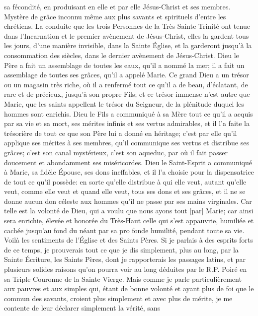 sa fécondité, en produisant en elle et par elle Jésus-Christ et ses membres. Mystère de grâce inconnu même aux
plus savants et spirituels d'entre les chrétiens.
 La conduite que les trois Personnes de la Très Sainte Trinité ont tenue dans l'Incarnation et le premier
avènement de Jésus-Christ, elles la gardent tous les jours, d'une manière invisible, dans la Sainte Église, et la
garderont jusqu'à la consommation des siècles, dans le dernier avènement de Jésus-Christ.
 Dieu le Père a fait un assemblage de toutes les eaux, qu'il a nommé la mer; il a fait un assemblage de toutes
ses grâces, qu'il a appelé Marie. Ce grand Dieu a un trésor ou un magasin très riche, où il a renfermé tout ce qu'il
a de beau, d'éclatant, de rare et de précieux, jusqu'à son propre Fils; et ce trésor immense n'est autre que Marie,
que les saints appellent le trésor du Seigneur, de la plénitude duquel les hommes sont enrichis.
 Dieu le Fils a communiqué à sa Mère tout ce qu'il a acquis par sa vie et sa mort, ses mérites infinis et ses
vertus admirables, et il l'a faite la trésorière de tout ce que son Père lui a donné en héritage; c'est par elle qu'il
applique ses mérites à ses membres, qu'il communique ses vertus et distribue ses grâces; c'est son canal
mystérieux, c'est son aqueduc, par où il fait passer doucement et abondamment ses miséricordes.
 Dieu le Saint-Esprit a communiqué à Marie, sa fidèle Épouse, ses dons ineffables, et il l'a choisie pour la
dispensatrice de tout ce qu'il possède: en sorte qu'elle distribue à qui elle veut, autant qu'elle veut, comme elle
veut et quand elle veut, tous ses dons et ses grâces, et il ne se donne aucun don céleste aux hommes qu'il ne
passe par ses mains virginales. Car telle est la volonté de Dieu, qui a voulu que nous ayons tout [par] Marie; car
ainsi sera enrichie, élevée et honorée du Très-Haut celle qui s'est appauvrie, humiliée et cachée jusqu'au fond du
néant par sa pro fonde humilité, pendant toute sa vie. Voilà les sentiments de l'Église et des Saints Pères.
 Si je parlais à des esprits forts de ce temps, je prouverais tout ce que je dis simplement, plus au long, par la
Sainte Écriture, les Saints Pères, dont je rapporterais les passages latins, et par plusieurs solides raisons qu'on
pourra voir au long déduites par le R.P. Poiré en sa Triple Couronne de la Sainte Vierge. Mais comme je parle
particulièrement aux pauvres et aux simples qui, étant de bonne volonté et ayant plus de foi que le commun des
savants, croient plus simplement et avec plus de mérite, je me contente de leur déclarer simplement la vérité, sans
